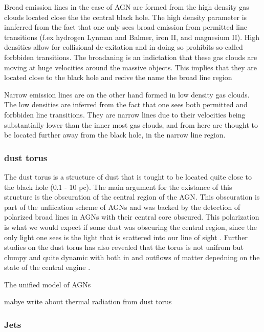 \documentclass{article}
\begin{document}
Broad emission lines in the case of AGN are formed from the high density gas clouds located close the the central black hole. The 
high density parameter is innferred from the fact that one only sees broad emission from permitted line transitions (f.ex hydrogen Lynman and Balmer,
iron II, and magnesium II). High densities allow for collisional de-exitation and in doing so prohibits so-called forbbiden transitions.
The broadaning is an indictation that these gas clouds are moving at  huge velocities around the massive objects. This implies that they are located close to the black hole and recive the name the broad line region

Narrow emission lines are on the other hand formed in low density gas clouds. The low densities are inferred from the fact that one sees
both permitted and forbbiden line transitions. They are narrow lines due to their velocities being substantially lower than the inner most gas clouds, and from here are thought to be located further away from the black hole, in the narrow line region. 


\subsubsection{dust torus}

The dust torus is a structure of dust that is tought to be located quite close to the black hole (0.1 - 10 pc). The main argument for the existance of this structure is the obscuration of the central region of the AGN. This obscuration 
is part of the unfiication scheme of AGNs and was backed by the detection of polarized broad lines in AGNs with their central core obscured. This polarization is what we would expect if some dust was obscuring the central region, since the only light one sees is 
the light that is scattered into our line of sight \cite{MASON201597}. Further studies on the dust torus has also revealed that the torus is not unifrom but clumpy and quite dynamic with both in and outflows of matter depedning on the state of the central engine \cite{MASON201597}. 




The unified model of AGNs 


mabye write about thermal radiation from dust torus


\subsubsection{Jets}
\end{document}
